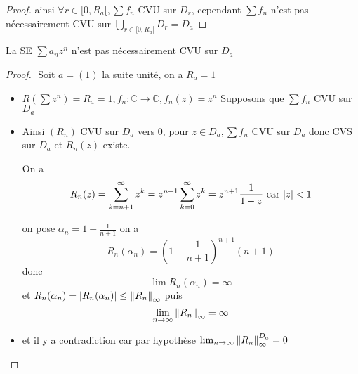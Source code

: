 \documentclass[11pt,hidelinks]{book}
\theoremstyle{mytheoremstyle}
\theoremstyle{mytheoremstyle}
\theoremstyle{mytheoremstyle}
\theoremstyle{mytheoremstyle}
\theoremstyle{mytheoremstyle}
\theoremstyle{mytheoremstyle}
\theoremstyle{mytheoremstyle}
\theoremstyle{mytheoremstyle}
\theoremstyle{myproblemstyle}
\def\mbb#1{\mathbb{#1}}
\def\bC{\mbb{C}}
\def\se{\sum a_n z^n}
\def\ln{\lim_{n \to \infty}}
\newcommand{\func}[3]{#1\colon#2\to#3}
\newcommand{\parenth}[1]{\left(#1\right)}
\begin{document}
\begin{adjustwidth}{-2em}{-1em}
\begin{theorem}
\begin{proof}
            ainsi $\forall r \in [0,R_a[, \sum f_n$ CVU sur $D_r$, cependant $\sum f_n$ n'est pas nécessairement CVU sur $\bigcup_{r \in [0,R_a[} D_r = D_a$
        \end{proof}
    \end{theorem}
    \begin{rmq}
        La SE $\se$ n'est pas nécessairement CVU sur $D_a$
        \begin{proof}$ $\newline
            Soit $a = (1)$ la suite unité, on a $R_a = 1$ 
            \begin{itemize}[label=$\circ$] 
            \item $R\parenth{\sum z^n} = R_a = 1, \func{f_n}{\bC}{\bC}, f_n(z) = z^n$ \newline 
            Supposons que $\sum f_n$ CVU sur $D_a$ 
             
            \item Ainsi $(R_n)$ CVU sur $D_a$ vers $0$, 
            pour $z \in D_a, \sum f_n$ CVU sur $D_a$ donc CVS sur $D_a$ et $R_n(z)$ existe.


            On a \begin{equation*}
                R_n(z) = \sum_{k=n+1}^{\infty} z^k = z^{n+1} \sum_{k=0}^{\infty} z^k = z^{n+1} \frac{1}{1-z} \text{ car } \abs{z} < 1
            \end{equation*}

            on pose $\alpha_n = 1 - \frac{1}{n+1}$ on a 
            \begin{equation*}
                R_n(\alpha_n) = \parenth{1 - \frac{1}{n+1}}^{n+1} (n+1)
            \end{equation*}
            donc 
            \begin{equation*}
                \lim R_n(\alpha_n) = \infty
            \end{equation*}
            et $R_n(\alpha_n) = \abs{R_n(\alpha_n)} \leq \norm{R_n}_{\infty}$ puis 
            \begin{equation*}
                \ln \norm{R_n}_{\infty} = \infty
            \end{equation*}
            \item et il y a contradiction car par hypothèse $\ln \norm{R_n}_{\infty}^{D_a} = 0$
            \end{itemize}
        \end{proof}
    \end{rmq}
\end{adjustwidth}
\end{document}
